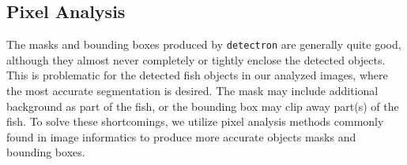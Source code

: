 \documentclass[conference]{IEEEtran}
\begin{document}

\subsection{Pixel Analysis}
The masks and bounding boxes produced by \verb|detectron| are generally quite good, although they almost never completely or tightly enclose the
detected objects.
This is problematic for the detected fish objects in our analyzed images,
where the most accurate segmentation is desired.
The mask may include additional background as part of the fish, or the
bounding box may clip away part(s) of the fish. To solve these
shortcomings, we utilize pixel analysis methods commonly found in image
informatics to produce more accurate objects masks and bounding boxes.
\end{document}

